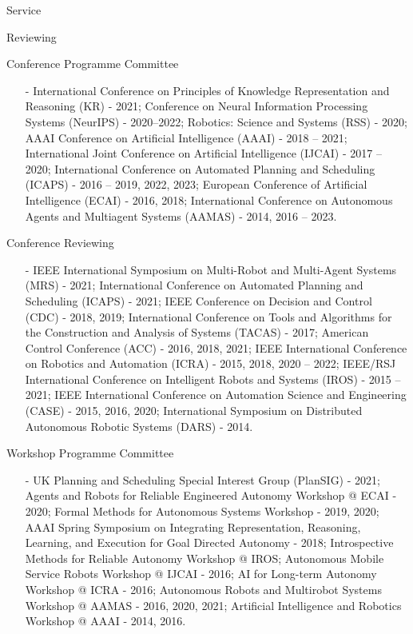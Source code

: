 \begin{rSection}{Service}
\begin{rSubsection}{Reviewing}{}{}{}
\item{Conference Programme Committee}
\begin{itemize}
\vspace*{-0.2cm}
\item[-]  International Conference on Principles of Knowledge Representation and Reasoning (KR) - 2021; Conference on Neural Information Processing Systems (NeurIPS) - 2020--2022; Robotics: Science and Systems (RSS) - 2020; AAAI Conference on Artificial Intelligence (AAAI) - 2018 -- 2021; International Joint Conference on Artificial Intelligence (IJCAI) - 2017 -- 2020; International Conference on Automated Planning and Scheduling (ICAPS) - 2016 -- 2019, 2022, 2023;  European Conference of Artificial Intelligence (ECAI) - 2016, 2018; International Conference on Autonomous Agents and Multiagent Systems (AAMAS) - 2014, 2016 -- 2023.
\end{itemize}

\item{Conference Reviewing}
\begin{itemize}
\vspace*{-0.2cm}
\item[-]  IEEE International Symposium on Multi-Robot and Multi-Agent Systems (MRS) - 2021; International Conference on Automated Planning and Scheduling (ICAPS) - 2021; IEEE Conference on Decision and Control (CDC) - 2018, 2019; International Conference on Tools and Algorithms for the Construction and Analysis of Systems (TACAS) - 2017; American Control Conference (ACC) - 2016, 2018, 2021; IEEE International Conference on Robotics and Automation (ICRA) - 2015, 2018, 2020 -- 2022; IEEE/RSJ International Conference on Intelligent Robots and Systems (IROS) - 2015 -- 2021; IEEE International Conference on Automation Science and Engineering (CASE) - 2015, 2016, 2020;  International Symposium on Distributed Autonomous Robotic Systems (DARS) - 2014.
\end{itemize}


\item{Workshop Programme Committee}
\begin{itemize}
\vspace*{-0.2cm}
\item[-] UK Planning and Scheduling Special Interest Group (PlanSIG) - 2021; Agents and Robots for Reliable Engineered Autonomy Workshop @ ECAI - 2020; Formal Methods for Autonomous Systems Workshop - 2019, 2020;  AAAI Spring Symposium on Integrating Representation, Reasoning, Learning, and Execution for Goal Directed Autonomy - 2018; Introspective Methods for Reliable Autonomy Workshop @ IROS; Autonomous Mobile Service Robots Workshop @ IJCAI - 2016; AI for Long-term Autonomy Workshop @ ICRA - 2016; Autonomous Robots and Multirobot Systems Workshop @ AAMAS - 2016, 2020, 2021; Artificial Intelligence and Robotics Workshop  @ AAAI - 2014, 2016.
\end{itemize}
\end{rSubsection}





\end{rSection}
